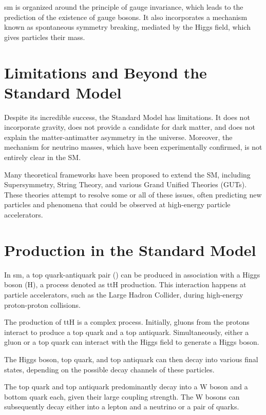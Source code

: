 \gls{sm} is organized around the principle of gauge invariance, which leads to the prediction of the existence of gauge
bosons. It also incorporates a mechanism known as spontaneous symmetry breaking, mediated by the Higgs field, which
gives particles their mass.

\section{Limitations and Beyond the Standard Model}

Despite its incredible success, the Standard Model has limitations. It does not incorporate gravity, does not provide a
candidate for dark matter, and does not explain the matter-antimatter asymmetry in the universe. Moreover, the mechanism
for neutrino masses, which have been experimentally confirmed, is not entirely clear in the SM.

Many theoretical frameworks have been proposed to extend the SM, including Supersymmetry, String Theory, and various
Grand Unified Theories (GUTs). These theories attempt to resolve some or all of these issues, often predicting new
particles and phenomena that could be observed at high-energy particle accelerators.

\section{\ttH Production in the Standard Model}







In \gls{sm}, a top quark-antiquark pair (\ttbar) can be produced in association with a Higgs boson (H), a process
denoted as ttH production. This interaction happens at particle accelerators, such as the Large Hadron Collider, during
high-energy proton-proton collisions.

The production of ttH is a complex process. Initially, gluons from the protons interact to produce a top quark and a top
antiquark. Simultaneously, either a gluon or a top quark can interact with the Higgs field to generate a Higgs boson.

The Higgs boson, top quark, and top antiquark can then decay into various final states, depending on the possible decay
channels of these particles.

The top quark and top antiquark predominantly decay into a W boson and a bottom quark each, given their large coupling
strength. The W bosons can subsequently decay either into a lepton and a neutrino or a pair of quarks.

